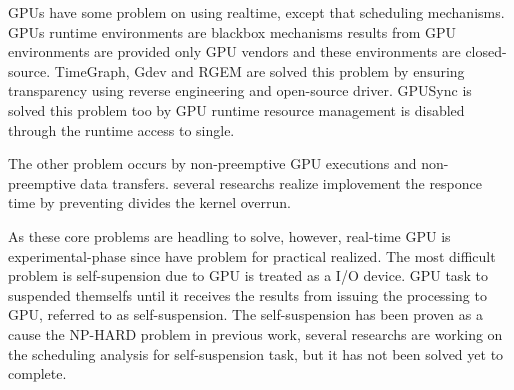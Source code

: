 GPUs have some problem on using realtime, except that scheduling mechanisms.
GPUs runtime environments are blackbox mechanisms results from GPU environments are provided only GPU vendors and these environments are closed-source.
TimeGraph, Gdev and RGEM are solved this problem by ensuring transparency using reverse engineering and open-source driver.
GPUSync is solved this problem too by GPU runtime resource management is disabled through the runtime access to single.

The other problem occurs by non-preemptive GPU executions and non-preemptive data transfers.
several researchs\cite{basaran:preemptive,sparc} realize implovement the responce time by preventing divides the kernel overrun.

As these core problems are headling to solve, however, real-time GPU is experimental-phase since have problem for practical realized.
The most difficult problem is self-supension due to GPU is treated as a I/O device.
GPU task to suspended themselfs until it receives the results from issuing the processing to GPU, referred to as self-suspension.
The self-suspension has been proven as a cause the NP-HARD problem in previous work\cite{self-sus:1,self-sus:2},
several researchs\cite{chattopadhyay2014limited, kim2013segment} are working on the scheduling analysis for self-suspension task, but it has not been solved yet to complete.

